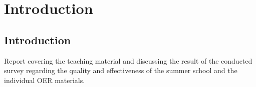 \chapter{Introduction}
\label{ch:intro}

\section{Introduction}

Report covering the teaching material and discussing the result of the conducted survey regarding the quality
and effectiveness of the summer school and the individual OER materials.
